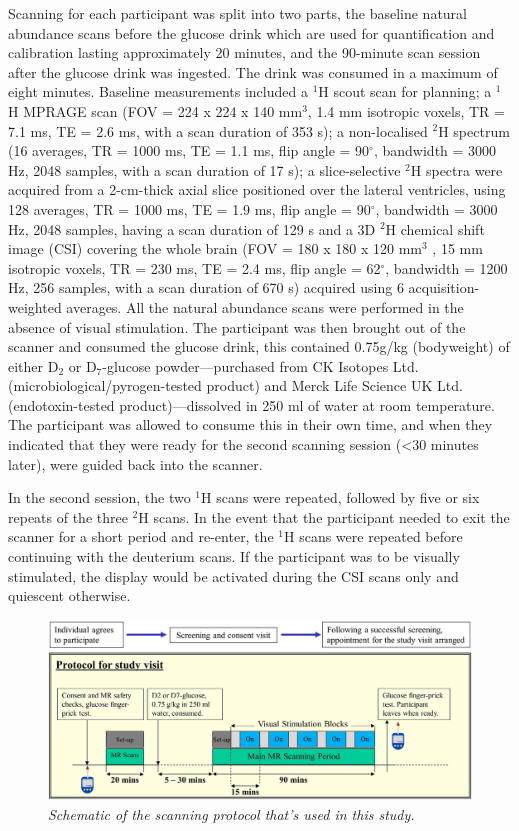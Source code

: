 \documentclass[class=article, crop=false]{standalone}
\begin{document}
Scanning for each participant was split into two parts, the baseline natural abundance scans before the glucose drink which are used for quantification and calibration lasting approximately 20 minutes, and the 90-minute scan session after the glucose drink was ingested. The drink was consumed in a maximum of eight minutes. Baseline measurements included a $^1$H scout scan for planning; a $^1$H MPRAGE scan (FOV = 224 x 224 x 140 mm$^3$, 1.4 mm isotropic voxels, TR = 7.1 ms, TE = 2.6 ms, with a scan duration of 353 s); a non-localised $^2$H spectrum (16 averages, TR = 1000 ms, TE = 1.1 ms, flip angle = 90$^\circ$, bandwidth = 3000 Hz, 2048 samples, with a scan duration of 17 s); a slice-selective $^2$H spectra were acquired from a 2-cm-thick axial slice positioned over the lateral ventricles, using 128 averages, TR = 1000 ms, TE = 1.9 ms, flip angle = 90$^\circ$, bandwidth = 3000 Hz,  2048 samples, having a scan duration of 129 s and a 3D $^2$H chemical shift image (CSI) covering the whole brain (FOV = 180 x 180 x 120 mm$^3$ , 15 mm isotropic voxels, TR = 230 ms, TE = 2.4 ms, flip angle = 62$^\circ$, bandwidth = 1200 Hz, 256 samples, with a scan duration of 670 s) acquired using 6 acquisition-weighted \cite{Pohmann2001AccurateCSI} averages. All the natural abundance scans were performed in the absence of visual stimulation. The participant was then brought out of the scanner and consumed the glucose drink, this contained 0.75g/kg (bodyweight) of either D$_2$ or D$_7$-glucose powder—purchased from CK Isotopes Ltd. (microbiological/pyrogen-tested product) and Merck Life Science UK Ltd. (endotoxin-tested product)—dissolved in 250 ml of water at room temperature. The participant was allowed to consume this in their own time, and when they indicated that they were ready for the second scanning session (<30 minutes later), were guided back into the scanner.

In the second session, the two $^1$H scans were repeated, followed by five or six repeats of the three $^2$H scans. In the event that the participant needed to exit the scanner for a short period and re-enter, the $^1$H scans were repeated before continuing with the deuterium scans. If the participant was to be visually stimulated, the display would be activated during the CSI scans only and quiescent otherwise.  

\begin{figure}
    \centering
    \includegraphics[width = 1\textwidth]{Figures/Glucose/Protocol.png}
    \caption{\textit{Schematic of the scanning protocol that's used in this study.}}
    \label{fig:Glu:Protocol}
\end{figure}
\end{document}

